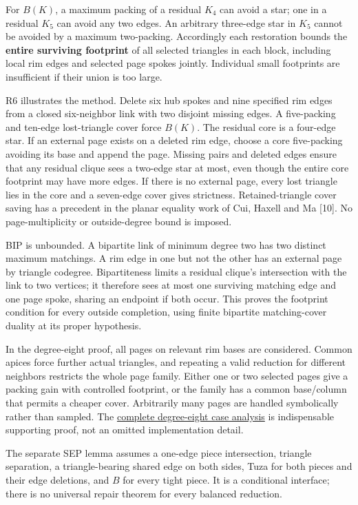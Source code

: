 \documentclass[11pt,a4paper]{article}
\begin{document}
For \(B(K)\), a maximum packing of a residual \(K_4\) can avoid a star; one in a residual \(K_5\) can avoid any two edges. An arbitrary three-edge star in \(K_5\) cannot be avoided by a maximum two-packing. Accordingly each restoration bounds the \textbf{entire surviving footprint} of all selected triangles in each block, including local rim edges and selected page spokes jointly. Individual small footprints are insufficient if their union is too large.

R6 illustrates the method. Delete six hub spokes and nine specified rim edges from a closed six-neighbor link with two disjoint missing edges. A five-packing and ten-edge lost-triangle cover force \(B(K)\). The residual core is a four-edge star. If an external page exists on a deleted rim edge, choose a core five-packing avoiding its base and append the page. Missing pairs and deleted edges ensure that any residual clique sees a two-edge star at most, even though the entire core footprint may have more edges. If there is no external page, every lost triangle lies in the core and a seven-edge cover gives strictness. Retained-triangle cover saving has a precedent in the planar equality work of Cui, Haxell and Ma {[}10{]}. No page-multiplicity or outside-degree bound is imposed.

BIP is unbounded. A bipartite link of minimum degree two has two distinct maximum matchings. A rim edge in one but not the other has an external page by triangle codegree. Bipartiteness limits a residual clique's intersection with the link to two vertices; it therefore sees at most one surviving matching edge and one page spoke, sharing an endpoint if both occur. This proves the footprint condition for every outside completion, using finite bipartite matching-cover duality at its proper hypothesis.

In the degree-eight proof, all pages on relevant rim bases are considered. Common apices force further actual triangles, and repeating a valid reduction for different neighbors restricts the whole page family. Either one or two selected pages give a packing gain with controlled footprint, or the family has a common base/column that permits a cheaper cover. Arbitrarily many pages are handled symbolically rather than sampled. The \href{https://github.com/pappa211/ai-math-experiments/blob/main/problems/TUZA-15/notes/SCOUT_B_DEGREE8.md}{complete degree-eight case analysis} is indispensable supporting proof, not an omitted implementation detail.

The separate SEP lemma assumes a one-edge piece intersection, triangle separation, a triangle-bearing shared edge on both sides, Tuza for both pieces and their edge deletions, and \(B\) for every tight piece. It is a conditional interface; there is no universal repair theorem for every balanced reduction.
\end{document}
